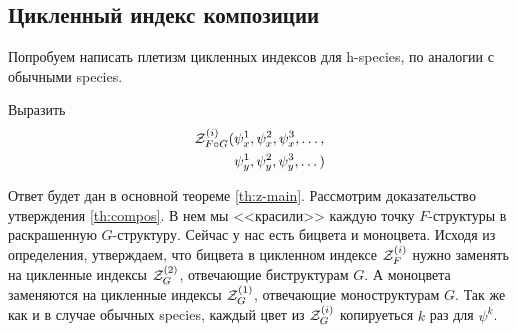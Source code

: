 \subsection{Цикленный индекс композиции}
Попробуем написать плетизм цикленных индексов для h-species,
по аналогии с обычными species.

\begin{problem}
Выразить
\begin{equation*}
\begin{split}
\mathcal Z^{(i)}_{F \circ G} (&\psi_x^1, \psi_x^2, \psi_x^3, \dots, \\
						&\psi_y^1, \psi_y^2, \psi_y^3, \dots)
\end{split}
\end{equation*}
\end{problem}
Ответ будет дан в основной теореме \ref{th:z-main}. Рассмотрим доказательство
утверждения \ref{th:compos}. В нем мы <<красили>> каждую точку $F$-структуры в раскрашенную $G$-структуру. Сейчас у нас есть
бицвета и моноцвета. Исходя из определения, утверждаем, что
бицвета в цикленном индексе $\mathcal Z^{(i)}_F$ нужно заменять на
цикленные индексы $\mathcal Z^{(2)}_G$, отвечающие биструктурам $G$. А моноцвета заменяются
на цикленные индексы $\mathcal Z^{(1)}_G$, отвечающие моноструктурам $G$. Так же как и в
случае обычных species, каждый цвет из $\mathcal Z^{(i)}_G$ копируеться $k$ раз для $\psi^k$. 

